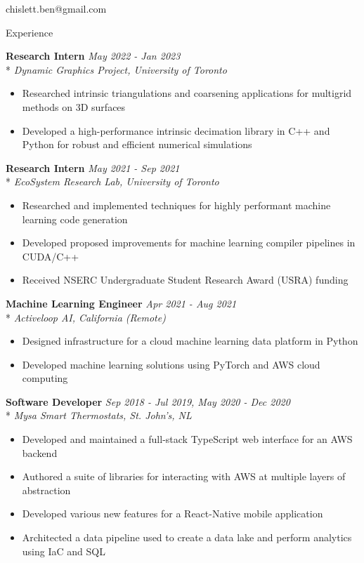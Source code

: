 \documentclass[11pt, letterpaper]{article}
\title{}
\author{Benjamin Chislett}
\date{}
\begin{document}
\begin{center}
  \Huge\theauthor
  \par
  \vspace{1mm}
  \large{chislett.ben@gmail.com}
  \par
\end{center}

\begin{section}{Experience}

\textbf{Research Intern}
\hfill
\textit{May 2022 - Jan 2023}\\*
\textit{Dynamic Graphics Project, University of Toronto}
\begin{itemize}
  \item Researched intrinsic triangulations and coarsening applications for multigrid methods on 3D surfaces
  \item Developed a high-performance intrinsic decimation library in C++ and Python for robust and efficient numerical simulations \\
\end{itemize}

\textbf{Research Intern}
\hfill
\textit{May 2021 - Sep 2021}\\*
\textit{EcoSystem Research Lab, University of Toronto}
\begin{itemize}
  \item Researched and implemented techniques for highly performant machine learning code generation
  \item Developed proposed improvements for machine learning compiler pipelines in CUDA/C++
  \item Received NSERC Undergraduate Student Research Award (USRA) funding \\
\end{itemize}

\textbf{Machine Learning Engineer}
\hfill
\textit{Apr 2021 - Aug 2021}\\*
\textit{Activeloop AI, California (Remote)}
\begin{itemize}
  \item Designed infrastructure for a cloud machine learning data platform in Python
  \item Developed machine learning solutions using PyTorch and AWS cloud computing \\
\end{itemize}

\textbf{Software Developer}
\hfill
\textit{Sep 2018 - Jul 2019, May 2020 - Dec 2020}\\*
\textit{Mysa Smart Thermostats, St. John's, NL}
\begin{itemize}
  \item Developed and maintained a full-stack TypeScript web interface for an AWS backend
  \item Authored a suite of libraries for interacting with AWS at multiple layers of abstraction
  \item Developed various new features for a React-Native mobile application
  \item Architected a data pipeline used to create a data lake and perform analytics using IaC and SQL \\
\end{itemize}


\end{section}
\end{document}
